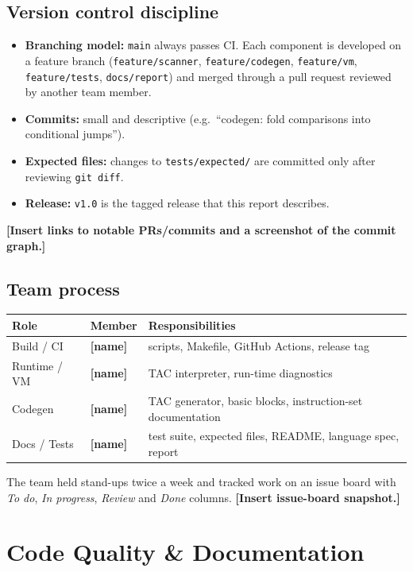 \documentclass[11pt,letterpaper]{article}
\newcommand{\fillin}[1]{\textcolor{fill}{\textbf{[#1]}}}   %
\newcommand{\code}[1]{\texttt{#1}}
\begin{document}
\subsection{Version control discipline}
\begin{itemize}
  \item \textbf{Branching model:} \code{main} always passes CI. Each component is developed on a feature branch (\code{feature/scanner}, \code{feature/codegen}, \code{feature/vm}, \code{feature/tests}, \code{docs/report}) and merged through a pull request reviewed by another team member.
  \item \textbf{Commits:} small and descriptive (e.g.\ ``codegen: fold comparisons into conditional jumps'').
  \item \textbf{Expected files:} changes to \code{tests/expected/} are committed only after reviewing \code{git diff}.
  \item \textbf{Release:} \code{v1.0} is the tagged release that this report describes.
\end{itemize}
\fillin{Insert links to notable PRs/commits and a screenshot of the commit graph.}

\subsection{Team process}
\begin{tabularx}{\linewidth}{>{\raggedright}p{3.2cm} >{\raggedright}p{4.4cm} X}
\toprule
\textbf{Role} & \textbf{Member} & \textbf{Responsibilities} \\
\midrule
Build / CI & \fillin{name} & scripts, Makefile, GitHub Actions, release tag \\
Runtime / VM & \fillin{name} & TAC interpreter, run-time diagnostics \\
Codegen & \fillin{name} & TAC generator, basic blocks, instruction-set documentation \\
Docs / Tests & \fillin{name} & test suite, expected files, README, language spec, report \\
\bottomrule
\end{tabularx}

The team held stand-ups twice a week and tracked work on an issue board with \emph{To do}, \emph{In progress}, \emph{Review} and \emph{Done} columns. \fillin{Insert issue-board snapshot.}

\section{Code Quality \& Documentation}
\end{document}
